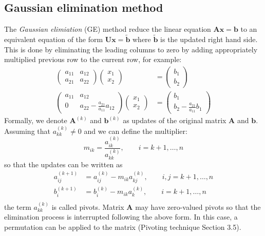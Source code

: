 \documentclass{article}
\begin{document}
\subsection{Gaussian elimination method}
The \emph{Gaussian elimiation} (GE) method reduce the linear equation 
$\mathbf{A}\mathbf{x} = \mathbf{b}$ to an equivalent equation 
of the form $\mathbf{U}\mathbf{x} = \tilde{\mathbf{b}}$ where $\tilde{\mathbf{b}}$
is the updated right hand side. 
This is done by eliminating the leading columns to zero by adding appropriately multiplied 
previous row to the current row, for example:
\begin{align*}
    \left(\begin{matrix}
        a_{11} & a_{12} \\
        a_{21} & a_{22} 
    \end{matrix}\right)
    \left(\begin{matrix}
        x_1 \\ x_2
    \end{matrix}\right) &= 
    \left(\begin{matrix}
        b_1 \\ b_2
    \end{matrix}\right) \\
    \left(\begin{matrix}
        a_{11} & a_{12} \\
        0 & a_{22} - \frac{a_{21}}{a_{11}} a_{12}
    \end{matrix}\right)
    \left(\begin{matrix}
        x_1 \\ x_2
    \end{matrix}\right) &= 
    \left(\begin{matrix}
        b_1 \\ b_2 - \frac{a_{21}}{a_{11}} b_1
    \end{matrix}\right)
\end{align*}
Formally, we denote $\mathbf{A}^{(k)}$ and $\mathbf{b}^{(k)}$ as updates of the 
original matrix $\mathbf{A}$ and $\mathbf{b}$. Assuming that $a_{kk}^{(k)}\neq 0$ and 
we can define the multiplier:
\begin{equation}
    m_{ik} = \frac{a_{ik}^{(k)}}{a_{kk}^{(k)}} 
    ,\qquad i = k+1, \dots, n
\end{equation}
so that the updates can be written as
\begin{align*}
    a_{ij}^{(k+1)} &= a_{ij}^{(k)} - m_{ik}a_{kj}^{(k)}
    ,\qquad i,j = k+1, \dots, n \\
    b_{i}^{(k+1)} &= b_{i}^{(k)} - m_{ik}a_{k}^{(k)}
    ,\qquad i = k+1, \dots, n \\
\end{align*}
the term $a_{kk}^{(k)}$ is called pivots. Matrix $\mathbf{A}$ may have zero-valued pivots so 
that the elimination process is interrupted following the above form. In this case, a 
permutation can be applied to the matrix (Pivoting technique Section 3.5).
\end{document}
